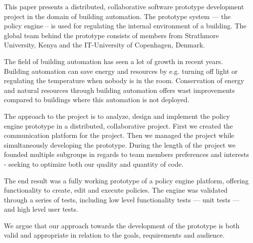 This paper presents a distributed, collaborative software prototype development project in the domain of building automation. The prototype system --- the policy engine -- is used for regulating the internal environment of a building. The global team behind the prototype consists of members from Strathmore University, Kenya and the IT-University of Copenhagen, Denmark. 

The field of building automation has seen a lot of growth in recent years. Building automation can save energy and resources by e.g. turning off light or regulating the temperature when nobody is in the room. Conservation of energy and natural resources through building automation offers wast improvements compared to buildings where this automation is not deployed. 

The approach to the project is to analyze, design and implement the policy engine prototype in a distributed, collaborative project. First we created the communication platform for the project. Then we managed the project while simultaneously developing the prototype. During the length of the project we founded multiple subgroups in regards to team members preferences and interests - seeking to optimize both our quality and quantity of code.

The end result was a fully working prototype of a policy engine platform, offering functionality to create, edit and execute policies. The engine was validated through a series of tests, including low level functionality tests --- unit tests --- and high level user tests. 

We argue that our approach towards the development of the prototype is both valid and appropriate in relation to the goals, requirements and audience.
